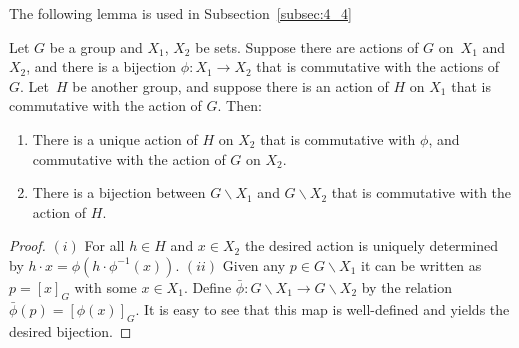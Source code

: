 The following lemma is used in Subsection~\ref{subsec:4_4}
\begin{lemma}\label{lem:apr8_1}
Let $G$ be a group and $X_1$, $X_2$ be sets.
Suppose there are actions of $G$ on~$X_1$ and~$X_2$, and there is a bijection $\phi : X_1 \rightarrow X_2$ that is
commutative with the actions of~$G$.
Let~$H$ be another group, and suppose there is an action of $H$ on $X_1$ that is commutative with the action of $G$.
Then:
\begin{enumerate}\itemsep=0pt
\item There is a unique action of $H$ on $X_2$ that is commutative with $\phi$, and commutative with
the action of $G$ on $X_2$.
\item There is a bijection between $G \backslash X_1$ and  $G \backslash X_2$ that is commutative with the action of $H$.
\end{enumerate}
\end{lemma}
\begin{proof}
$(i)$ For all $h \in H$ and $x \in X_2$
the desired action is uniquely determined by $h \cdot x = \phi (h \cdot \phi^{-1} (x))$.
$(ii)$
Given any $p \in G \backslash X_1$ it can be written as $p = [x]_G$ with some $x \in X_1$.
Def\/ine $\bar{\phi}: G \backslash X_1 \rightarrow G \backslash X_2$ by the relation $\bar{\phi} (p) = [\phi (x)]_G$.
It is easy to see that this map is well-def\/ined and yields the desired bijection.
\end{proof}
